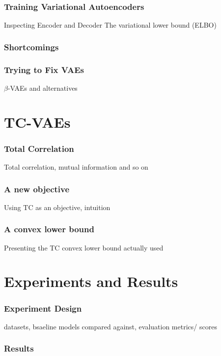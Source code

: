 \documentclass{beamer}
\theoremstyle{definition}
\begin{document}
    \begin{frame}
      \frametitle{Training Variational Autoencoders}
      Inspecting Encoder and Decoder
      The variational lower bound (ELBO)
    \end{frame}

    \begin{frame}
      \frametitle{Shortcomings}
    \end{frame}

    \begin{frame}
      \frametitle{Trying to Fix VAEs}
      $\beta$-VAEs and alternatives
    \end{frame}


  \section{TC-VAEs}
    \begin{frame}
      \frametitle{Total Correlation}
      Total correlation, mutual information and so on
    \end{frame}

    \begin{frame}
      \frametitle{A new objective}
      Using TC as an objective, intuition
    \end{frame}

    \begin{frame}
      \frametitle{A convex lower bound}
      Presenting the TC convex lower bound actually used
    \end{frame}


  \section{Experiments and Results}
    \begin{frame}
      \frametitle{Experiment Design}
      datasets, bsaeline models compared against, evaluation metrics/ scores
    \end{frame}

    \begin{frame}
      \frametitle{Results}
    \end{frame}
\end{document}

